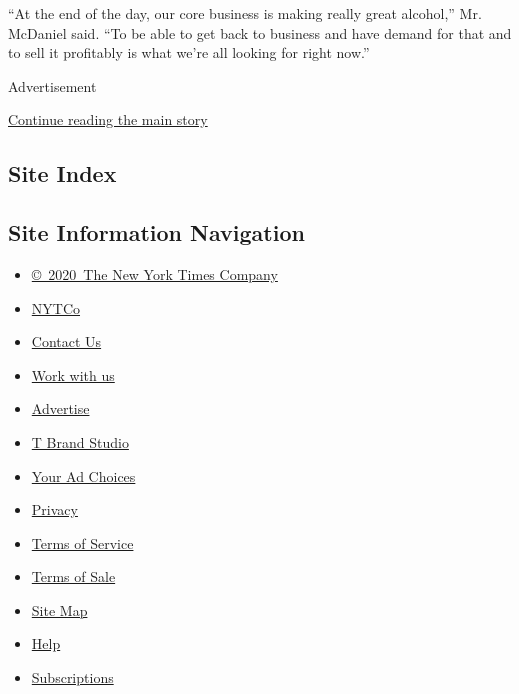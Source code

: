 ``At the end of the day, our core business is making really great
alcohol,'' Mr. McDaniel said. ``To be able to get back to business and
have demand for that and to sell it profitably is what we're all looking
for right now.''

Advertisement

\protect\hyperlink{after-bottom}{Continue reading the main story}

\hypertarget{site-index}{%
\subsection{Site Index}\label{site-index}}

\hypertarget{site-information-navigation}{%
\subsection{Site Information
Navigation}\label{site-information-navigation}}

\begin{itemize}
\tightlist
\item
  \href{https://help.nytimes3xbfgragh.onion/hc/en-us/articles/115014792127-Copyright-notice}{©~2020~The
  New York Times Company}
\end{itemize}

\begin{itemize}
\tightlist
\item
  \href{https://www.nytco.com/}{NYTCo}
\item
  \href{https://help.nytimes3xbfgragh.onion/hc/en-us/articles/115015385887-Contact-Us}{Contact
  Us}
\item
  \href{https://www.nytco.com/careers/}{Work with us}
\item
  \href{https://nytmediakit.com/}{Advertise}
\item
  \href{http://www.tbrandstudio.com/}{T Brand Studio}
\item
  \href{https://www.nytimes3xbfgragh.onion/privacy/cookie-policy\#how-do-i-manage-trackers}{Your
  Ad Choices}
\item
  \href{https://www.nytimes3xbfgragh.onion/privacy}{Privacy}
\item
  \href{https://help.nytimes3xbfgragh.onion/hc/en-us/articles/115014893428-Terms-of-service}{Terms
  of Service}
\item
  \href{https://help.nytimes3xbfgragh.onion/hc/en-us/articles/115014893968-Terms-of-sale}{Terms
  of Sale}
\item
  \href{https://spiderbites.nytimes3xbfgragh.onion}{Site Map}
\item
  \href{https://help.nytimes3xbfgragh.onion/hc/en-us}{Help}
\item
  \href{https://www.nytimes3xbfgragh.onion/subscription?campaignId=37WXW}{Subscriptions}
\end{itemize}
